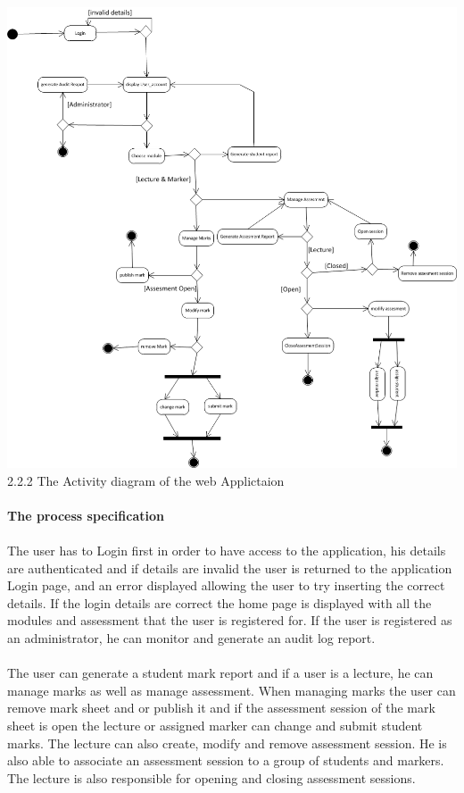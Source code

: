 \documentclass[12pt,a4paper]{article}
\begin{document}
\includegraphics[scale=0.60]{activity_diagram.png}
2.2.2 The Activity diagram of the web Applictaion\\\\
\textbf{The process specification}\\\\
The user has to Login first in order to have access to the application, his details are authenticated and if details are invalid the user is returned to the application Login page, and an error displayed allowing the user to try inserting the correct details. If the login details are correct the home page is displayed with all the modules and assessment that the user is registered for. If the user is registered as an administrator, he can monitor and generate an audit log report.\\\\
The user can generate a student mark report and if a user is a lecture, he can manage marks as well as manage assessment. When managing marks the user can remove mark sheet and or publish it and if the assessment session of the mark sheet is open the lecture or assigned marker can change and submit student marks. The lecture can also create, modify and remove assessment session. He is also able to associate an assessment session to a group of students and markers. The lecture is also responsible for opening and closing assessment sessions. \\\
\end{document}
